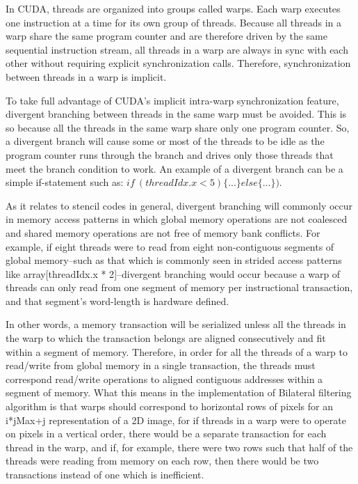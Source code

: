 \documentclass{IEEEtran}
\begin{document}
In CUDA, threads are organized into groups called warps. Each warp executes one instruction at a time for its own group of threads. Because all threads in a warp share the same program counter and are therefore driven by the same sequential instruction stream, all threads in a warp are always in sync with each other without requiring explicit synchronization calls. Therefore, synchronization between threads in a warp is implicit.

To take full advantage of CUDA's implicit intra-warp synchronization feature, divergent branching between threads in the same warp must be avoided. This is so because all the threads in the same warp share only one program counter. So, a divergent branch will cause some or most of the threads to be idle as the program counter runs through the branch and drives only those threads that meet the branch condition to work. An example of a divergent branch can be a simple if-statement such as: $if~(threadIdx.x < 5)\{...\} else\{...\})$.

As it relates to stencil codes in general, divergent branching will commonly occur in memory access patterns in which global memory operations are not coalesced and shared memory operations are not free of memory bank conflicts. For example, if eight threads were to read from eight non-contiguous segments of global memory--such as that which is commonly seen in strided access patterns like array{[}threadIdx.x {*} 2{]}--divergent branching would occur because a warp of threads can only read from one segment of memory per instructional transaction, and that segment's word-length is hardware defined.

In other words, a memory transaction will be serialized unless all the threads in the warp to which the transaction belongs are aligned consecutively and fit within a segment of memory. Therefore, in order for all the threads of a warp to read/write from global memory in a single transaction, the threads must correspond read/write operations to aligned contiguous addresses within a segment of memory. What this means in the implementation of Bilateral filtering algorithm is that warps should correspond to horizontal rows of pixels for an i{*}jMax+j representation of a 2D image, for if threads in a warp were to operate on pixels in a vertical order, there would be a separate transaction for each thread in the warp, and if, for example, there were two rows such that half of the threads were reading from memory on each row, then there would be two transactions instead of one which is inefficient.
\end{document}
